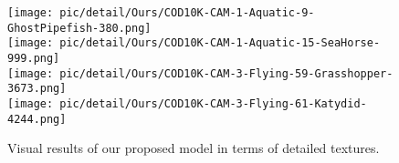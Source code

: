 \documentclass{ecai}
\begin{document}
\begin{figure}[t]
{\begin{minipage}[t]{0.32\columnwidth}
			\texttt{[image: pic/detail/Ours/COD10K-CAM-1-Aquatic-9-GhostPipefish-380.png]}\\
			\vspace{0.01\linewidth}
                \texttt{[image: pic/detail/Ours/COD10K-CAM-1-Aquatic-15-SeaHorse-999.png]}\\
			\vspace{0.01\linewidth}
                \texttt{[image: pic/detail/Ours/COD10K-CAM-3-Flying-59-Grasshopper-3673.png]}\\
                \vspace{0.01\linewidth}
			\texttt{[image: pic/detail/Ours/COD10K-CAM-3-Flying-61-Katydid-4244.png]}\\
			\vspace{0.11\linewidth}
		\end{minipage}%
	}\hspace{-0.012\columnwidth}
	\centering
	\caption{Visual results of our proposed model in terms of detailed textures.}
    \label{fig:detail}

\end{figure}
\end{document}
